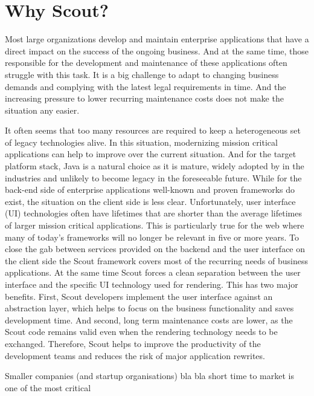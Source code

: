 \documentclass[a4paper,10pt,twoside]{book}
\begin{document}
\section{Why Scout?}

Most large organizations develop and maintain enterprise applications that have a direct impact on the success of the ongoing business. 
And at the same time, those responsible for the development and maintenance of these applications often struggle with this task. 
It is a big challenge to adapt to changing business demands and complying with the latest legal requirements in time. 
And the increasing pressure to lower recurring maintenance costs does not make the situation any easier.

It often seems that too many resources are required to keep a heterogeneous set of legacy technologies alive. 
In this situation, modernizing mission critical applications can help to improve over the current situation. 
And for the target platform stack, Java is a natural choice as it is mature, widely adopted by in the industries and unlikely to become legacy in the foreseeable future. 
While for the back-end side of enterprise applications well-known and proven frameworks do exist, the situation on the client side is less clear. 
Unfortunately, user interface (UI) technologies often have lifetimes that are shorter than the average lifetimes of larger mission critical applications. 
This is particularly true for the web where many of today's frameworks will no longer be relevant in five or more years. 
To close the gab between services provided on the backend and the user interface on the client side the Scout framework covers most of the recurring needs of business applications. 
At the same time Scout forces a clean separation between the user interface and the specific UI technology used for rendering. 
This has two major benefits. 
First, Scout developers implement the user interface against an abstraction layer, which helps to focus on the business functionality and saves development time. 
And second, long term maintenance costs are lower, as the Scout code remains valid even when the rendering technology needs to be exchanged. 
Therefore, Scout helps to improve the productivity of the development teams and reduces the risk of major application rewrites. 

Smaller companies (and startup organisations) bla bla
short time to market is one of the most critical 
\end{document}
